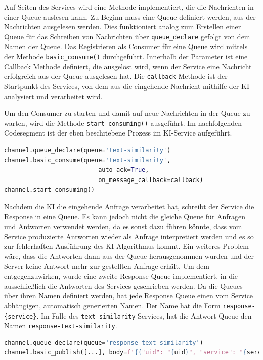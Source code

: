 Auf Seiten des Services wird eine Methode implementiert, die die Nachrichten in einer Queue auslesen kann. Zu Beginn muss eine Queue definiert werden, aus der Nachrichten ausgelesen werden. Dies funktioniert analog zum Erstellen einer Queue für das Schreiben von Nachrichten über \texttt{queue\_{}declare} gefolgt von dem Namen der Queue. Das Registrieren als Consumer für eine Queue wird mittels der Methode \texttt{basic\_{}consume()} durchgeführt. Innerhalb der Parameter ist eine Callback Methode definiert, die ausgelöst wird, wenn der Service eine Nachricht erfolgreich aus der Queue ausgelesen hat. Die \texttt{callback} Methode ist der Startpunkt des Services, von dem aus die eingehende Nachricht mithilfe der KI analysiert und verarbeitet wird.

Um den Consumer zu starten und damit auf neue Nachrichten in der Queue zu warten, wird die Methode \texttt{start\_{}consuming()} ausgeführt. Im nachfolgenden Codesegment ist der eben beschriebene Prozess im KI-Service aufgeführt.

\begin{lstlisting}[language=Python]
channel.queue_declare(queue='text-similarity')
channel.basic_consume(queue='text-similarity',
                          auto_ack=True,
                          on_message_callback=callback)
channel.start_consuming()
\end{lstlisting}

Nachdem die KI die eingehende Anfrage verarbeitet hat, schreibt der Service die Response in eine Queue. Es kann jedoch nicht die gleiche Queue für Anfragen und Antworten verwendet werden, da es sonst dazu führen könnte, dass vom Service produzierte Antworten wieder als Anfrage interpretiert werden und es so zur fehlerhaften Ausführung des KI-Algorithmus kommt. Ein weiteres Problem wäre, dass die Antworten dann aus der Queue herausgenommen wurden und der Server keine Antwort mehr zur gestellten Anfrage erhält. Um dem entgegenzuwirken, wurde eine zweite \glqq Response-Queue\grqq{} implementiert, in die ausschließlich die Antworten des Services geschrieben werden. Da die Queues über ihren Namen definiert werden, hat jede Response Queue einen vom Service abhängigen, automatisch generierten Namen. Der Name hat die Form \texttt{response-\{service\}}. Im Falle des \texttt{text-similarity} Services, hat die Antwort Queue den Namen \texttt{response-text-similarity}. 

\begin{lstlisting}[language=Python]
channel.queue_declare(queue='response-text-similarity')
channel.basic_publish([...], body=f'{{"uid": "{uid}", "service": "{service}", "message": {json.dumps(message)}}}'.encode('utf-8'))
\end{lstlisting}


